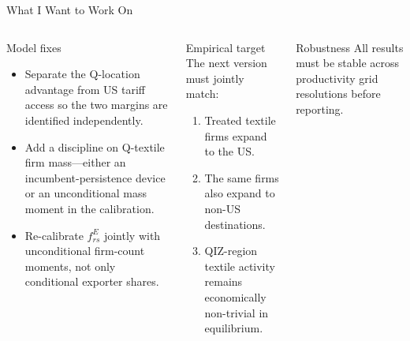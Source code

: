 \documentclass[aspectratio=169,10pt]{beamer}
\begin{document}
\begin{frame}{What I Want to Work On}
\small
\begin{columns}[T]
\begin{block}{Model fixes}
\begin{itemize}
  \item Separate the Q-location advantage from US tariff access so the two margins are identified independently.
  \item Add a discipline on Q-textile firm mass---either an incumbent-persistence device or an unconditional mass moment in the calibration.
  \item Re-calibrate $f^E_{rs}$ jointly with unconditional firm-count moments, not only conditional exporter shares.
\end{itemize}
\end{block}

\begin{block}{Empirical target}
The next version must jointly match:
\begin{enumerate}
  \item Treated textile firms expand to the US.
  \item The same firms also expand to non-US destinations.
  \item QIZ-region textile activity remains economically non-trivial in equilibrium.
\end{enumerate}
\end{block}

\vspace{0.4em}
\begin{block}{Robustness}
All results must be stable across productivity grid resolutions before reporting.
\end{block}
\end{columns}
\end{frame}
\end{document}
